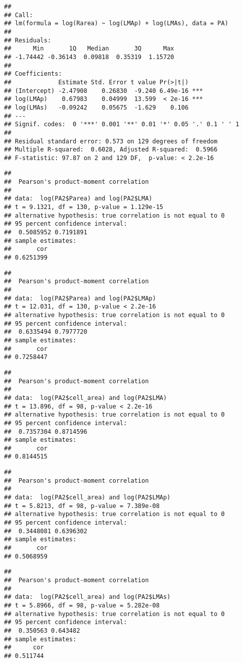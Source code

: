 \documentclass[12pt,]{article}
\begin{document}
\begin{verbatim}
## 
## Call:
## lm(formula = log(Rarea) ~ log(LMAp) + log(LMAs), data = PA)
## 
## Residuals:
##      Min       1Q   Median       3Q      Max 
## -1.74442 -0.36143  0.09818  0.35319  1.15720 
## 
## Coefficients:
##             Estimate Std. Error t value Pr(>|t|)    
## (Intercept) -2.47908    0.26830  -9.240 6.49e-16 ***
## log(LMAp)    0.67983    0.04999  13.599  < 2e-16 ***
## log(LMAs)   -0.09242    0.05675  -1.629    0.106    
## ---
## Signif. codes:  0 '***' 0.001 '**' 0.01 '*' 0.05 '.' 0.1 ' ' 1
## 
## Residual standard error: 0.573 on 129 degrees of freedom
## Multiple R-squared:  0.6028, Adjusted R-squared:  0.5966 
## F-statistic: 97.87 on 2 and 129 DF,  p-value: < 2.2e-16
\end{verbatim}

\begin{verbatim}
## 
##  Pearson's product-moment correlation
## 
## data:  log(PA2$Parea) and log(PA2$LMA)
## t = 9.1321, df = 130, p-value = 1.129e-15
## alternative hypothesis: true correlation is not equal to 0
## 95 percent confidence interval:
##  0.5085952 0.7191891
## sample estimates:
##       cor 
## 0.6251399
\end{verbatim}

\begin{verbatim}
## 
##  Pearson's product-moment correlation
## 
## data:  log(PA2$Parea) and log(PA2$LMAp)
## t = 12.031, df = 130, p-value < 2.2e-16
## alternative hypothesis: true correlation is not equal to 0
## 95 percent confidence interval:
##  0.6335494 0.7977720
## sample estimates:
##       cor 
## 0.7258447
\end{verbatim}

\begin{verbatim}
## 
##  Pearson's product-moment correlation
## 
## data:  log(PA2$cell_area) and log(PA2$LMA)
## t = 13.896, df = 98, p-value < 2.2e-16
## alternative hypothesis: true correlation is not equal to 0
## 95 percent confidence interval:
##  0.7357304 0.8714596
## sample estimates:
##       cor 
## 0.8144515
\end{verbatim}

\begin{verbatim}
## 
##  Pearson's product-moment correlation
## 
## data:  log(PA2$cell_area) and log(PA2$LMAp)
## t = 5.8213, df = 98, p-value = 7.389e-08
## alternative hypothesis: true correlation is not equal to 0
## 95 percent confidence interval:
##  0.3448081 0.6396302
## sample estimates:
##       cor 
## 0.5068959
\end{verbatim}

\begin{verbatim}
## 
##  Pearson's product-moment correlation
## 
## data:  log(PA2$cell_area) and log(PA2$LMAs)
## t = 5.8966, df = 98, p-value = 5.282e-08
## alternative hypothesis: true correlation is not equal to 0
## 95 percent confidence interval:
##  0.350563 0.643482
## sample estimates:
##      cor 
## 0.511744
\end{verbatim}
\end{document}
